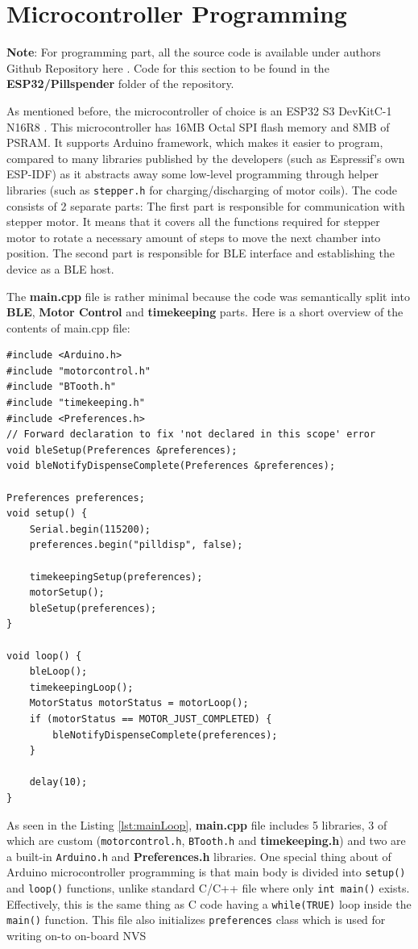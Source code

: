 \section{Microcontroller Programming}\label{sec:Backenddev}
\textbf{Note}: For programming part, all the source code is available under authors Github Repository here \cite{Github_src}. Code for this section to be found in the \textbf{ESP32/Pillspender} folder of the repository.

As mentioned before, the microcontroller of choice is an ESP32 S3 DevKitC-1 N16R8 \cite{microcontroller}. This microcontroller has 16MB Octal \ac{SPI} flash memory and 8MB of \ac{PSRAM}. It supports Arduino framework, which makes it easier to program, compared to many libraries published by the developers (such as Espressif's own ESP-IDF) as it abstracts away some low-level programming through helper libraries (such as \texttt{stepper.h} for charging/discharging of motor coils). The code consists of 2 separate parts: The first part is responsible for communication with stepper motor. It means that it covers all the functions required for stepper motor to rotate a necessary amount of steps to move the next chamber into position. The second part is responsible for \ac{BLE} interface and establishing the device as a \ac{BLE} host.

The \textbf{main.cpp} file is rather minimal because the code was semantically split into \textbf{\ac{BLE}}, \textbf{Motor Control} and \textbf{timekeeping} parts. Here is a short overview of the contents of main.cpp file:
\begin{lstlisting}[style=cppstyle, caption={Main Arduino Loop Code}, label={lst:mainLoop}]
#include <Arduino.h>
#include "motorcontrol.h"
#include "BTooth.h"
#include "timekeeping.h"
#include <Preferences.h> 
// Forward declaration to fix 'not declared in this scope' error
void bleSetup(Preferences &preferences); 
void bleNotifyDispenseComplete(Preferences &preferences);

Preferences preferences; 
void setup() {
	Serial.begin(115200);
	preferences.begin("pilldisp", false);
	
	timekeepingSetup(preferences);    
	motorSetup();
	bleSetup(preferences);          
}

void loop() {
	bleLoop();
	timekeepingLoop(); 
	MotorStatus motorStatus = motorLoop();
	if (motorStatus == MOTOR_JUST_COMPLETED) {
		bleNotifyDispenseComplete(preferences); 
	}
	
	delay(10);
}
\end{lstlisting}
As seen in the Listing \ref{lst:mainLoop}, \textbf{main.cpp} file includes 5 libraries, 3 of which are custom (\texttt{motorcontrol.h}, \texttt{BTooth.h} and \textbf{timekeeping.h}) and two are a built-in \texttt{Arduino.h} and  \textbf{Preferences.h} libraries. One special thing about of Arduino microcontroller programming is that main body is divided into \texttt{setup()} and \texttt{loop()} functions, unlike standard C/C++ file where only \texttt{int main()} exists. Effectively, this is the same thing as C code having a \texttt{while(TRUE)} loop inside the \texttt{main()} function. This file also initializes \texttt{preferences} class which is used for writing on-to on-board \ac{NVS}
